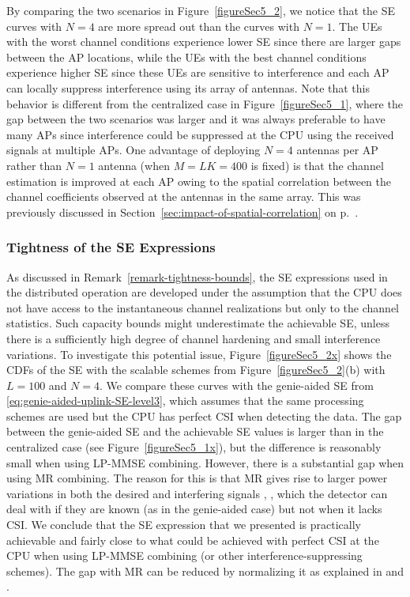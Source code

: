 \enlargethispage{\baselineskip}

By comparing the two scenarios in Figure~\ref{figureSec5_2}, we notice that the SE curves with $N=4$ are more spread out than the curves with $N=1$. The UEs with the worst channel conditions experience lower SE since there are larger gaps between the AP locations, while the UEs with the best channel conditions experience higher SE since these UEs are sensitive to interference and each AP can locally suppress interference using its array of antennas.
Note that this behavior is different from the centralized case in Figure~\ref{figureSec5_1}, where the gap between the two scenarios was larger and it was always preferable to have many APs since interference could be suppressed at the CPU using the received signals at multiple APs. One advantage of deploying $N=4$ antennas per AP rather than $N=1$ antenna (when $M=LK=400$ is fixed) is that the channel estimation is improved at each AP owing to the spatial correlation between the channel coefficients observed at the antennas in the same array. This was previously discussed in Section~\ref{sec:impact-of-spatial-correlation} on p.~\pageref{sec:impact-of-spatial-correlation}.

\subsubsection{Tightness of the SE Expressions}


As discussed in Remark~\ref{remark-tightness-bounds}, the SE expressions used in the distributed operation are developed under the assumption that the CPU does not have access to the instantaneous channel realizations but only to the channel statistics. Such capacity bounds might underestimate the achievable SE, unless there is a sufficiently high degree of channel hardening and small interference variations.
To investigate this potential issue, Figure~\ref{figureSec5_2x} shows the CDFs of the SE with the scalable schemes from Figure~\ref{figureSec5_2}(b) with $L=100$ and $N=4$. We compare these curves with the genie-aided SE from \eqref{eq:genie-aided-uplink-SE-level3}, which assumes that the same processing schemes are used but the CPU has perfect CSI when detecting the data.
The gap between the genie-aided SE and the achievable SE values is larger than in the centralized case (see Figure~\ref{figureSec5_1x}), but the difference is reasonably small when using LP-MMSE combining. However, there is a substantial gap when using MR combining. The reason for this is that MR gives rise to larger power variations in both the desired and interfering signals \cite{Bjornson2020a}, \cite{Interdonato2016a}, which the detector can deal with if they are known (as in the genie-aided case) but not when it lacks CSI.
We conclude that the SE expression that we presented is practically achievable and fairly close to what could be achieved with perfect CSI at the CPU when using LP-MMSE combining (or other interference-suppressing schemes). The gap with MR can be reduced by normalizing it as explained in \cite[Sec.~4.2.1]{massivemimobook} and \cite{Interdonato2016a}.


